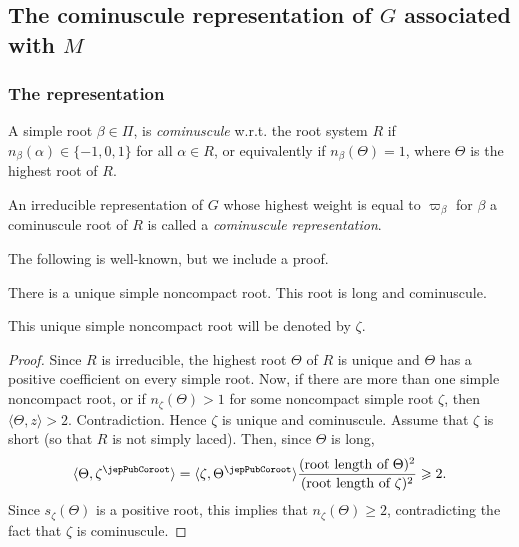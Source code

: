 \subsection{The cominuscule representation of $G$ associated with $M$}
\subsubsection{The representation}
\begin{definition}
A simple root $\beta\in\Pi$, is \emph{cominuscule} w.r.t. the root system $R$ if $n_\beta(\alpha)\in\{-1,0,1\}$ for all $\alpha\in R$, or equivalently if $n_\beta(\Theta)=1$, where $\Theta$ is the highest root of $R$.

An irreducible representation of $G$ whose highest weight is equal to $\varpi_\beta$ for $\beta$ a cominuscule root of $R$ is called a \emph{cominuscule representation}.
\end{definition}
The following is well-known, but we include a proof.
\begin{proposition}
There is a unique simple noncompact root. This root is long and cominuscule.
\end{proposition}
\begin{notation}
This unique simple noncompact root will be denoted by $\zeta$.
\end{notation}
\begin{proof}
Since $R$ is irreducible, the highest root $\Theta$ of $R$ is unique and $\Theta$ has a positive coefficient on every simple root. Now, if there are more than one simple noncompact root, or if $n_\zeta(\Theta)>1$ for some noncompact simple root $\zeta$, then $\langle\Theta,z\rangle>2$. Contradiction. Hence $\zeta$ is unique and cominuscule. Assume that $\zeta$ is short (so that $R$ is not simply laced). Then, since $\Theta$ is long,
\[
\langle\Theta,\zeta^\jepPubCoroot\rangle=\langle\zeta,\Theta^\jepPubCoroot\rangle\frac{(\text{root length of }\Theta)^2}{(\text{root length of }\zeta)^2}\geqslant2.
\]
Since $s_\zeta(\Theta)$ is a positive root, this implies that $n_\zeta(\Theta)\geqslant2$, contradicting the fact that $\zeta$ is cominuscule.
\end{proof}

